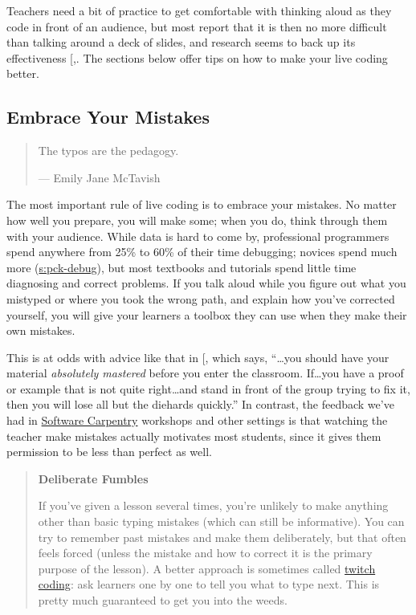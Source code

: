 Teachers need a bit of practice to get comfortable with thinking aloud
as they code in front of an audience, but most report that it is then no
more difficult than talking around a deck of slides, and research seems
to back up its effectiveness {[},\protect[\hyperlink{b:Haar2017}{Haar2017}]{]}. The sections
below offer tips on how to make your live coding better.

\subsection{Embrace Your Mistakes}\label{embrace-your-mistakes}

\begin{quote}\setlength{\parindent}{0pt}
The typos are the pedagogy.

--- Emily Jane McTavish
\end{quote}

The most important rule of live coding is to embrace your mistakes. No
matter how well you prepare, you will make some; when you do, think
through them with your audience. While data is hard to come by,
professional programmers spend anywhere from 25\% to 60\% of their time
debugging; novices spend much more (\protect\hyperlink{SECTION}{s:pck-debug}), but most
textbooks and tutorials spend little time diagnosing and correct
problems. If you talk aloud while you figure out what you mistyped or
where you took the wrong path, and explain how you've corrected
yourself, you will give your learners a toolbox they can use when they
make their own mistakes.

This is at odds with advice like that in {[}\protect[\hyperlink{b:Kran2015}{Kran2015}]{]}, which
says, ``\ldots{}you should have your material \emph{absolutely mastered} before
you enter the classroom. If\ldots{}you have a proof or example that is not
quite right\ldots{}and stand in front of the group trying to fix it, then
you will lose all but the diehards quickly.'' In contrast, the feedback
we've had in \href{http://software-carpentry.org}{Software Carpentry} workshops and other settings is
that watching the teacher make mistakes actually motivates most
students, since it gives them permission to be less than perfect as
well.

\begin{quote}\setlength{\parindent}{0pt}
\textbf{Deliberate Fumbles}

If you've given a lesson several times, you're unlikely to make
anything other than basic typing mistakes (which can still be
informative). You can try to remember past mistakes and make them
deliberately, but that often feels forced (unless the mistake and
how to correct it is the primary purpose of the lesson). A better
approach is sometimes called \protect\hyperlink{g:twitch-coding}{twitch coding}: ask
learners one by one to tell you what to type next. This is pretty
much guaranteed to get you into the weeds.
\end{quote}

